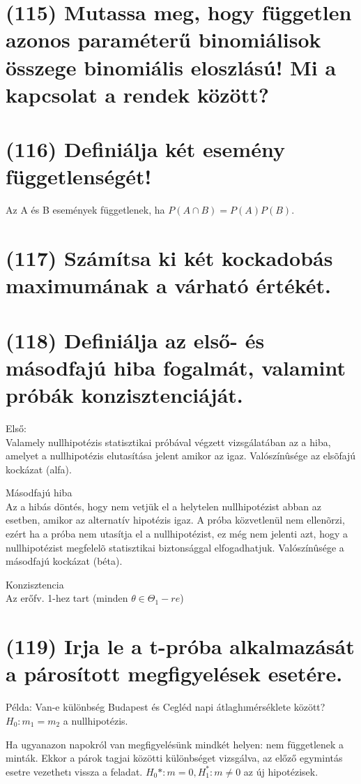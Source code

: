 \documentclass[12p]{article}
\begin{document}
\section{(115) Mutassa meg, hogy független azonos paraméterű binomiálisok összege binomiális eloszlású! Mi a kapcsolat a rendek között?}

\section{(116) Definiálja két esemény függetlenségét!}

Az A és B események függetlenek, ha $P(A \cap B) = P(A)P(B)$.

\section{(117) Számítsa ki két kockadobás maximumának a várható értékét.}

\section{(118) Definiálja az első- és másodfajú hiba fogalmát, valamint próbák konzisztenciáját.}

Első:\\
Valamely nullhipotézis statisztikai próbával végzett vizsgálatában az a hiba, amelyet a nullhipotézis elutasítása jelent amikor az igaz. Valószínûsége az elsõfajú kockázat (alfa). 

Másodfajú hiba\\
Az a hibás döntés, hogy nem vetjük el a helytelen nullhipotézist abban az esetben, amikor az alternatív hipotézis igaz. A próba közvetlenül nem ellenõrzi, ezért ha a próba nem utasítja el a nullhipotézist, ez még nem jelenti azt, hogy a nullhipotézist megfelelõ statisztikai biztonsággal elfogadhatjuk. Valószínûsége a másodfajú kockázat (béta). 

Konzisztencia\\
Az erőfv. 1-hez tart (minden $\theta \in \Theta_1-re$)


\section{(119) Irja le a t-próba alkalmazását a párosított megfigyelések esetére.}

Példa: Van-e különbség Budapest és Cegléd napi átlaghımérséklete között?$H_0: m_1=m_2$ a nullhipotézis. 

Ha ugyanazon napokról van megfigyelésünk
mindkét helyen: nem függetlenek a minták.
Ekkor a párok tagjai közötti különbséget
vizsgálva, az előző egymintás esetre
vezethetı vissza a feladat. $H_0*: m=0 ,H_1^{*}:m\neq0$ az új hipotézisek. 
\end{document}
